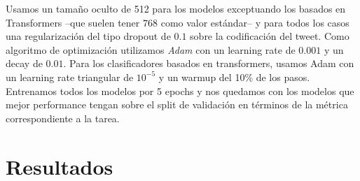 Usamos un tamaño oculto de 512 para los modelos exceptuando los basados en Transformers --que suelen tener $768$ como valor estándar-- y para todos los casos una regularización del tipo dropout \cite{srivastava2014dropout} de $0.1$ sobre la codificación del tweet. Como algoritmo de optimización utilizamos \emph{Adam} \cite{kingma2014adam} con un learning rate de $0.001$ y un decay de $0.01$. Para los clasificadores basados en transformers, usamos Adam con un learning rate triangular de $10^{-5}$ y un warmup del 10\% de los pasos. Entrenamos todos los modelos por 5 epochs y nos quedamos con los modelos que mejor performance tengan sobre el split de validación en términos de la métrica correspondiente a la tarea.


\section{Resultados}

